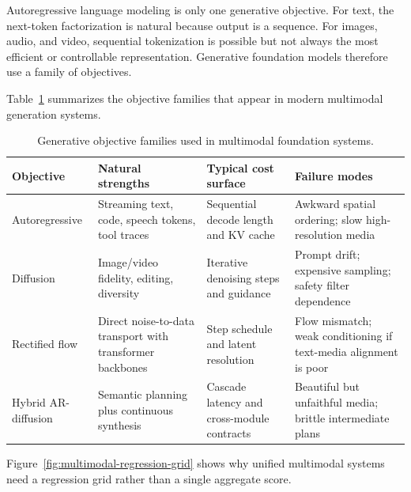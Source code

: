 Autoregressive language modeling is only one generative objective. For text, the next-token factorization is natural because output is a sequence. For images, audio, and video, sequential tokenization is possible but not always the most efficient or controllable representation. Generative foundation models therefore use a family of objectives.

Table~\ref{tab:generative-objective-families} summarizes the objective families that appear in modern multimodal generation systems.

\begin{table}[t]
\caption{Generative objective families used in multimodal foundation systems.}
\label{tab:generative-objective-families}
\small
\centering
\begin{tabular}{@{}p{}p{}p{}p{}@{}}
\toprule
Objective & Natural strengths & Typical cost surface & Failure modes \\
\midrule
Autoregressive & Streaming text, code, speech tokens, tool traces & Sequential decode length and KV cache & Awkward spatial ordering; slow high-resolution media \\
Diffusion & Image/video fidelity, editing, diversity & Iterative denoising steps and guidance & Prompt drift; expensive sampling; safety filter dependence \\
Rectified flow & Direct noise-to-data transport with transformer backbones & Step schedule and latent resolution & Flow mismatch; weak conditioning if text-media alignment is poor \\
Hybrid AR-diffusion & Semantic planning plus continuous synthesis & Cascade latency and cross-module contracts & Beautiful but unfaithful media; brittle intermediate plans \\
\bottomrule
\end{tabular}
\end{table}

Figure~\ref{fig:multimodal-regression-grid} shows why unified multimodal systems need a regression grid rather than a single aggregate score.

